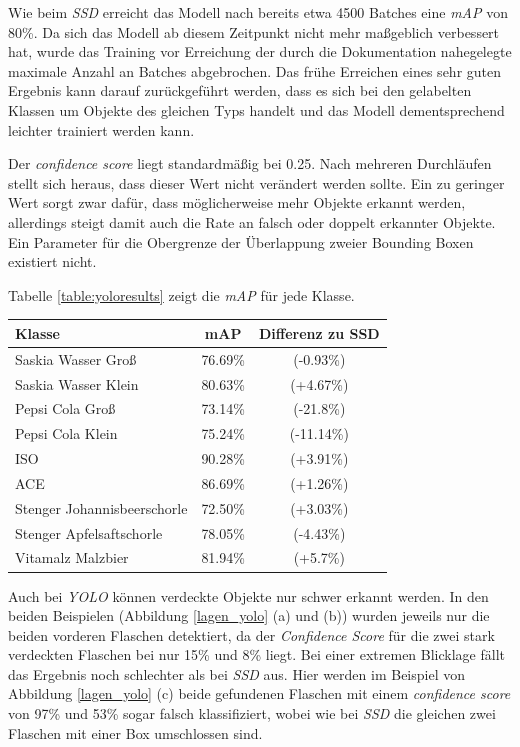 Wie beim \textit{SSD} erreicht das Modell nach bereits etwa 4500 Batches eine \textit{mAP} von 80\%. Da sich das Modell ab diesem Zeitpunkt nicht mehr maßgeblich verbessert hat, wurde das Training vor Erreichung der durch die Dokumentation nahegelegte maximale Anzahl an Batches abgebrochen. Das frühe Erreichen eines sehr guten Ergebnis kann darauf zurückgeführt werden, dass es sich bei den gelabelten Klassen um Objekte des gleichen Typs handelt und das Modell dementsprechend leichter trainiert werden kann. 

Der \textit{confidence score} liegt standardmäßig bei 0.25. Nach mehreren Durchläufen stellt sich heraus, dass dieser Wert nicht verändert werden sollte. Ein zu geringer Wert sorgt zwar dafür, dass möglicherweise mehr Objekte erkannt werden, allerdings steigt damit auch die Rate an falsch oder doppelt erkannter Objekte. Ein Parameter für die Obergrenze der Überlappung zweier Bounding Boxen existiert nicht.

Tabelle \ref{table:yoloresults} zeigt die \textit{mAP} für jede Klasse.

\begin{center}
	\begin{tabular}[H]{l|c|c}
		Klasse & mAP & Differenz zu SSD\\
		\hline
		Saskia Wasser Groß & 76.69\% & (-0.93\%) \\
		Saskia Wasser Klein & 80.63\% & (+4.67\%) \\
		Pepsi Cola Groß & 73.14\% & (-21.8\%) \\
		Pepsi Cola Klein & 75.24\% & (-11.14\%) \\
		ISO & 90.28\% & (+3.91\%) \\
		ACE & 86.69\% & (+1.26\%) \\
		Stenger Johannisbeerschorle & 72.50\% & (+3.03\%) \\
		Stenger Apfelsaftschorle & 78.05\% & (-4.43\%) \\
		Vitamalz Malzbier & 81.94\% & (+5.7\%)
	\end{tabular}
	\label{table:yoloresults}
\end{center}

Auch bei \textit{YOLO} können verdeckte Objekte nur schwer erkannt werden. In den beiden Beispielen (Abbildung \ref{lagen_yolo} (a) und (b)) wurden jeweils nur die beiden vorderen Flaschen detektiert, da der \textit{Confidence Score} für die zwei stark verdeckten Flaschen bei nur 15\% und 8\% liegt. Bei einer extremen Blicklage fällt das Ergebnis noch schlechter als bei \textit{SSD} aus. Hier werden im Beispiel von Abbildung \ref{lagen_yolo} (c) beide gefundenen Flaschen mit einem \textit{confidence score} von 97\% und 53\% sogar falsch klassifiziert, wobei wie bei \textit{SSD} die gleichen zwei Flaschen mit einer Box umschlossen sind.


